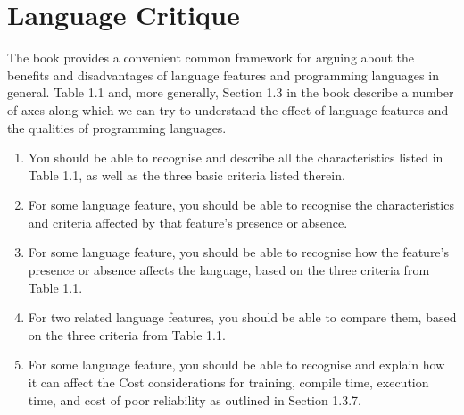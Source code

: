 \section{Language Critique}\label{sec:Language_Critique}
The book provides a convenient common framework for arguing about the benefits and disadvantages of language features and programming languages in general.
Table 1.1 and, more generally, Section 1.3 in the book describe a number of axes along which we can try to understand the effect of language features and the qualities of programming languages.

\begin{enumerate}[noitemsep]
\item You should be able to recognise and describe all the characteristics listed in Table 1.1, as well as the three basic criteria listed therein.
\item For some language feature, you should be able to recognise the characteristics and criteria affected by that feature's presence or absence.
\item For some language feature, you should be able to recognise how the feature's presence or absence affects the language, based on the three criteria from Table 1.1.
\item For two related language features, you should be able to compare them, based on the three criteria from Table 1.1.
\item For some language feature, you should be able to recognise and explain how it can affect the Cost considerations for training, compile time, execution time, and cost of poor reliability as outlined in Section 1.3.7.
\end{enumerate}

